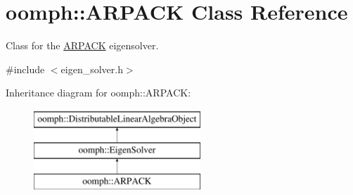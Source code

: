 \hypertarget{classoomph_1_1ARPACK}{}\section{oomph\+:\+:A\+R\+P\+A\+CK Class Reference}
\label{classoomph_1_1ARPACK}


Class for the \hyperlink{classoomph_1_1ARPACK}{A\+R\+P\+A\+CK} eigensolver.  




{\ttfamily \#include $<$eigen\+\_\+solver.\+h$>$}

Inheritance diagram for oomph\+:\+:A\+R\+P\+A\+CK\+:\begin{figure}[H]
\begin{center}
\leavevmode
\includegraphics[height=3.000000cm]{classoomph_1_1ARPACK}
\end{center}
\end{figure}

